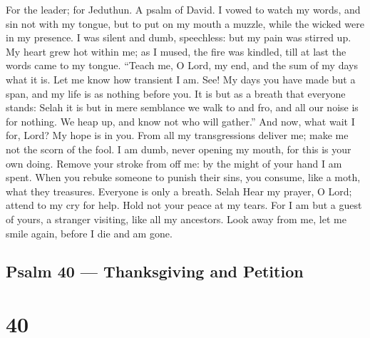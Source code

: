 For the leader; for Jeduthun. A psalm of David.  I vowed to
watch my words, and sin not with my tongue, but to put on my mouth a
muzzle, while the wicked were in my presence.  I was silent
and dumb, speechless: but my pain was stirred up.  My heart
grew hot within me; as I mused, the fire was kindled, till at last the
words came to my tongue.  ``Teach me, O Lord, my end, and
the sum of my days what it is. Let me know how transient I am.
 See! My days you have made but a span, and my life is as
nothing before you. It is but as a breath that everyone stands: Selah
 it is but in mere semblance we walk to and fro, and all our
noise is for nothing. We heap up, and know not who will gather.''
 And now, what wait I for, Lord? My hope is in you.
 From all my transgressions deliver me; make me not the
scorn of the fool.  I am dumb, never opening my mouth, for
this is your own doing.  Remove your stroke from off me: by
the might of your hand I am spent.  When you rebuke someone
to punish their sins, you consume, like a moth, what they treasures.
Everyone is only a breath. Selah  Hear my prayer, O Lord;
attend to my cry for help. Hold not your peace at my tears. For I am but
a guest of yours, a stranger visiting, like all my ancestors.
 Look away from me, let me smile again, before I die and am
gone.

\hypertarget{psalm-40-thanksgiving-and-petition}{%
\subsection{Psalm 40 --- Thanksgiving and
Petition}\label{psalm-40-thanksgiving-and-petition}}

\hypertarget{section-39}{%
\section{40}\label{section-39}}

